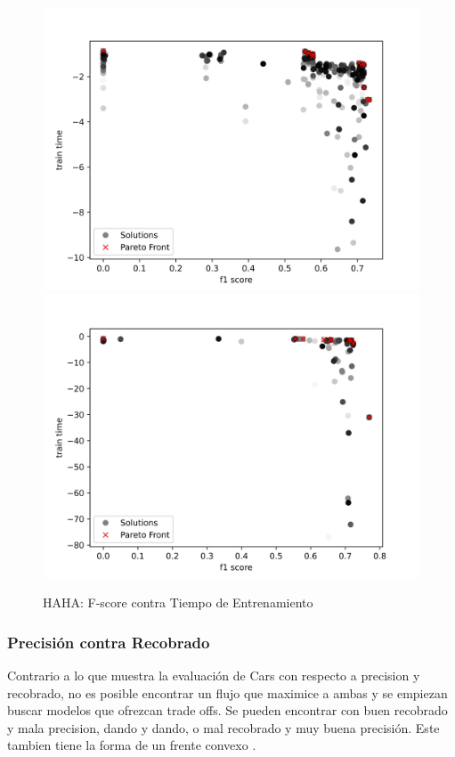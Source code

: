 \begin{figure}[ht]
    \centering
    \includegraphics[scale=0.75]{Pictures/haha_fscore_vs_time.jpg}
    \includegraphics[scale=0.75]{Pictures/haha_fscore_vs_time_3min.jpg}
    \caption{HAHA: F-score contra Tiempo de Entrenamiento}
    \label{impl:fig:haha:fscore_vs_time}
\end{figure}
\subsubsection{Precisi\'on contra Recobrado}

Contrario a lo que muestra la evaluaci\'on de Cars con respecto a precision y recobrado, no es posible encontrar un flujo que maximice a ambas y se empiezan buscar modelos que ofrezcan trade offs. Se pueden encontrar con buen recobrado y mala precision, dando y dando, o mal recobrado y muy buena precisi\'on. Este tambien tiene la forma de un frente convexo .

